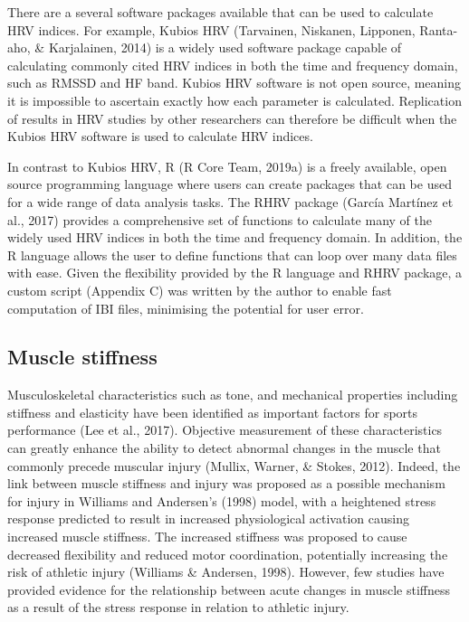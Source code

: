 \documentclass[
  english,
  man,floatsintext]{apa6}
\begin{document}
There are a several software packages available that can be used to calculate HRV indices.
For example, Kubios HRV (Tarvainen, Niskanen, Lipponen, Ranta-aho, \& Karjalainen, 2014) is a widely used software package capable of calculating commonly cited HRV indices in both the time and frequency domain, such as RMSSD and HF band.
Kubios HRV software is not open source, meaning it is impossible to ascertain exactly how each parameter is calculated.
Replication of results in HRV studies by other researchers can therefore be difficult when the Kubios HRV software is used to calculate HRV indices.

In contrast to Kubios HRV, R (R Core Team, 2019a) is a freely available, open source programming language where users can create packages that can be used for a wide range of data analysis tasks.
The RHRV package (García Martínez et al., 2017) provides a comprehensive set of functions to calculate many of the widely used HRV indices in both the time and frequency domain. In addition, the R language allows the user to define functions that can loop over many data files with ease.
Given the flexibility provided by the R language and RHRV package, a custom script (Appendix C) was written by the author to enable fast computation of IBI files, minimising the potential for user error.

\hypertarget{muscle-stiffness}{%
\subsection{Muscle stiffness}\label{muscle-stiffness}}

Musculoskeletal characteristics such as tone, and mechanical properties including stiffness and elasticity have been identified as important factors for sports performance (Lee et al., 2017).
Objective measurement of these characteristics can greatly enhance the ability to detect abnormal changes in the muscle that commonly precede muscular injury (Mullix, Warner, \& Stokes, 2012).
Indeed, the link between muscle stiffness and injury was proposed as a possible mechanism for injury in Williams and Andersen's (1998) model, with a heightened stress response predicted to result in increased physiological activation causing increased muscle stiffness.
The increased stiffness was proposed to cause decreased flexibility and reduced motor coordination, potentially increasing the risk of athletic injury (Williams \& Andersen, 1998).
However, few studies have provided evidence for the relationship between acute changes in muscle stiffness as a result of the stress response in relation to athletic injury.
\end{document}
